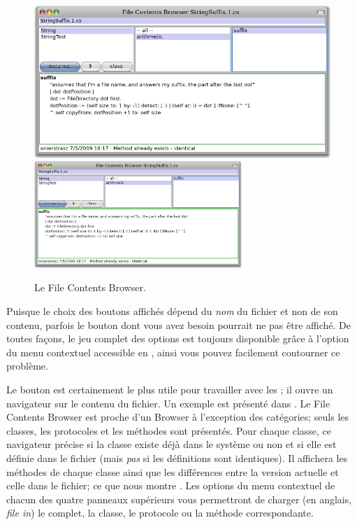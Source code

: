 \documentclass[a4paper,10pt,twoside]{book}
\begin{document}
\begin{figure}[btp]
	\begin{center}
	\ifluluelse
		{\includegraphics[width=\textwidth]{fileContentsBrowser}}
		{\includegraphics[width=0.7\textwidth]{fileContentsBrowser}}
	\end{center}
	\caption{Le File Contents Browser.}
\end{figure}

Puisque le choix des boutons affichés dépend du \emph{nom} du fichier et
non de son contenu, parfois le bouton dont vous avez besoin pourrait ne pas être
affiché.
De toutes façons, le jeu complet des options est toujours disponible
grâce
à l'option  du menu contextuel accessible en \actclickant,
ainsi vous pouvez facilement contourner ce problème.

Le bouton  est certainement le plus utile pour travailler avec les \changesets;
il ouvre un navigateur sur le contenu du fichier. Un exemple est présenté dans
.
Le File Contents Browser est proche d'un Browser à l'exception
des catégories; seuls les classes, les protocoles et les méthodes sont présentés.
Pour chaque classe, ce navigateur précise si la classe existe déjà dans
le système ou non et si elle est définie dans le fichier (mais \emph{pas} si
les définitions sont identiques).
Il affichera les méthodes de chaque classe
ainsi que les différences entre la version actuelle et celle dans le fichier; ce que
nous montre .
Les options du menu contextuel de chacun des quatre panneaux supérieurs vous
permettront de charger (en anglais, \emph{file in}) le \changeset complet, la classe, 
le protocole ou la méthode correspondante.
\end{document}
